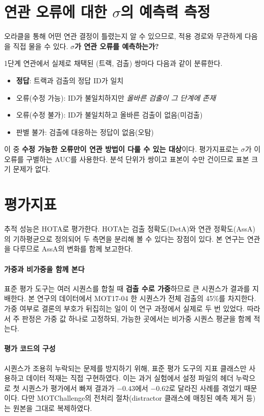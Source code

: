 \documentclass[12pt,a4paper,oneside]{report}
\begin{document}
\section{연관 오류에 대한 $\sigma$의 예측력 측정}\label{sec:4-4}

오라클을 통해 어떤 연관 결정이 틀렸는지 알 수 있으므로, 적용 경로와 무관하게 다음을 직접 물을 수 있다. \textbf{$\sigma$가 연관 오류를 예측하는가?}

1단계 연관에서 실제로 채택된 (트랙, 검출) 쌍마다 다음과 같이 분류한다.

\begin{itemize}[leftmargin=2em]
\item \textbf{정답}: 트랙과 검출의 정답 ID가 일치
\item 오류(수정 가능): ID가 불일치하지만 \textit{올바른 검출이 그 단계에 존재}
\item 오류(수정 불가): ID가 불일치하고 올바른 검출이 없음(미검출)
\item 판별 불가: 검출에 대응하는 정답이 없음(오탐)
\end{itemize}

이 중 \textbf{수정 가능한 오류만이 연관 방법이 다룰 수 있는 대상}이다. 평가지표로는 $\sigma$가 이 오류를 구별하는 AUC를 사용한다. 분석 단위가 쌍이고 표본이 수만 건이므로 표본 크기 문제가 없다.

\section{평가지표}\label{sec:4-5}

추적 성능은 HOTA\citep{luiten2021}로 평가한다. HOTA는 검출 정확도(DetA)와 연관 정확도(AssA)의 기하평균으로 정의되어 두 측면을 분리해 볼 수 있다는 장점이 있다. 본 연구는 연관을 다루므로 AssA의 변화를 함께 보고한다.

\paragraph{가중과 비가중을 함께 본다} 표준 평가 도구는 여러 시퀀스를 합칠 때 \textbf{검출 수로 가중}하므로 큰 시퀀스가 결과를 지배한다. 본 연구의 데이터에서 MOT17-04 한 시퀀스가 전체 검출의 45\%를 차지한다. 가중 여부로 결론의 부호가 뒤집히는 일이 이 연구 과정에서 실제로 두 번 있었다. 따라서 주 판정은 가중 값 하나로 고정하되, 가능한 곳에서는 비가중 시퀀스 평균을 함께 적는다.

\paragraph{평가 코드의 구성} 시퀀스가 조용히 누락되는 문제를 방지하기 위해, 표준 평가 도구의 지표 클래스만 사용하고 데이터 적재는 직접 구현하였다. 이는 과거 실험에서 설정 파일의 헤더 누락으로 첫 시퀀스가 평가에서 빠져 결과가 $-0.43$에서 $-0.62$로 달라진 사례를 겪었기 때문이다. 다만 MOTChallenge의 전처리 절차(distractor 클래스에 매칭된 예측 제거 등)는 원본을 그대로 복제하였다.
\end{document}
